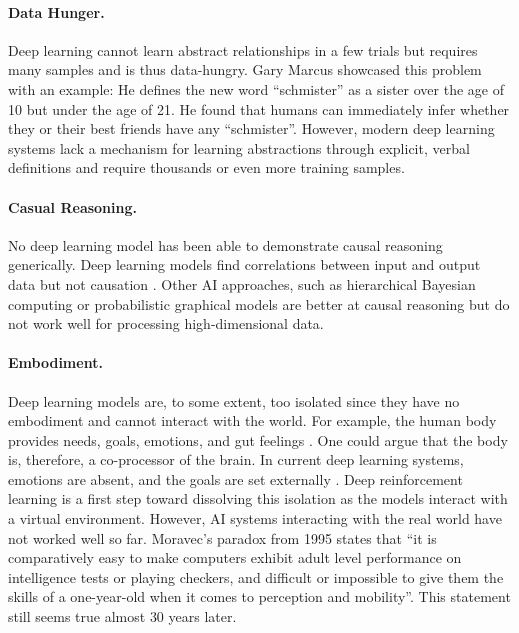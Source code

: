 \paragraph{Data Hunger.} Deep learning cannot learn abstract relationships in a few trials but requires many samples and is thus data-hungry.
Gary Marcus  showcased this problem with an example: He defines the new word ``schmister'' as a sister over the age of 10 but under the age of 21. He found that humans can immediately infer whether they or their best friends have any ``schmister''. However, modern deep learning systems lack a mechanism for learning abstractions through explicit, verbal definitions and require thousands or even more training samples.

\paragraph{Casual Reasoning.} No deep learning model has been able to demonstrate causal reasoning generically.
Deep learning models find correlations between input and output data but not causation .
Other AI approaches, such as hierarchical Bayesian computing \cite{allenby_hierarchical_2005} or probabilistic graphical models \cite{koller_probabilistic_2009} are better at causal reasoning but do not work well for processing high-dimensional data.

\paragraph{Embodiment.} Deep learning models are, to some extent, too isolated since they have no embodiment and cannot interact with the world.
For example, the human body provides needs, goals, emotions, and gut feelings . One could argue that the body is, therefore, a co-processor of the brain.
In current deep learning systems, emotions are absent, and the goals are set externally .
Deep reinforcement learning  is a first step toward dissolving this isolation as the models interact with a virtual environment. 
However, AI systems interacting with the real world have not worked well so far.
Moravec's paradox from 1995  states that ``it is comparatively easy to make computers exhibit adult level performance on intelligence tests or playing checkers, and difficult or impossible to give them the skills of a one-year-old when it comes to perception and mobility''.
This statement still seems true almost $30$ years later.

